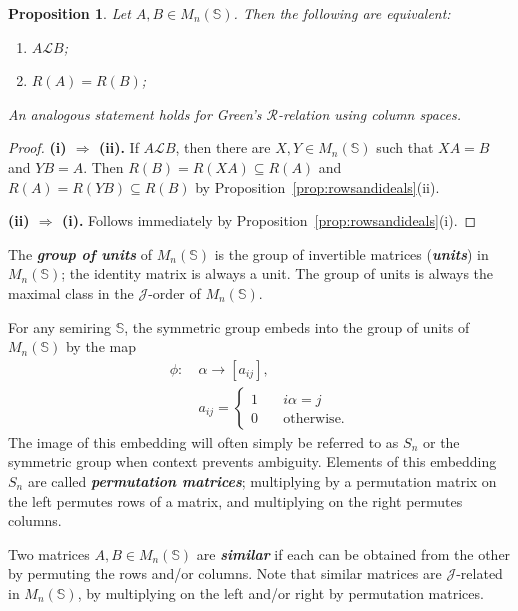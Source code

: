 \documentclass[11pt]{article}
\newtheorem{prop}[thm]{Proposition}
\newcommand{\defn}[1]{\textbf{\textit{#1}}}
\numberwithin{equation}{section}
\renewcommand{\to}{\longrightarrow}
\renewcommand{\L}{\mathscr{L}}
\newcommand{\R}{\mathscr{R}}
\newcommand{\J}{\mathscr{J}}
\begin{document}
\begin{prop} 
  Let $A, B \in M_n(\mathbb{S})$. Then the following are equivalent:
  \begin{enumerate}[label=\roman*]
    \item 
      $A \L B$;

    \item 
      $R(A) = R(B)$;
  \end{enumerate}
  An analogous statement holds for Green's $\R$-relation using column spaces. 
\end{prop}
\begin{proof}
  \textbf{(i) $\Rightarrow$ (ii).} 
  If $A \L B$, then there are $X, Y \in M_n(\mathbb{S})$ such that $XA = B$ and
  $YB = A$. Then $R(B) = R(XA) \subseteq R(A)$ and $R(A) = R(YB) \subseteq R(B)$
  by Proposition~\ref{prop:rowsandideals}(ii).
  \bigskip

  \textbf{(ii) $\Rightarrow$ (i).} Follows immediately by
  Proposition~\ref{prop:rowsandideals}(i). 
\end{proof}

The \defn{group of units} of $M_n(\mathbb{S})$ is the group of invertible
matrices (\defn{units}) in $M_n(\mathbb{S})$; the identity matrix is always a
unit. The group of units is always the maximal class in the $\J$-order of
$M_n(\mathbb{S})$.

For any semiring $\mathbb{S}$, the symmetric group embeds into the group of units of
$M_n(\mathbb{S})$ by the map 
\begin{align*}
  \phi:\: &\alpha \to [a_{ij}], \\
  &a_{ij} =
    \begin{cases}
      1 \quad & i\alpha = j \\ 
      0 \quad &\text{otherwise}.
    \end{cases}
\end{align*}
The image of this embedding will often simply be referred to as $S_n$ or the
symmetric group when context prevents ambiguity. Elements of this embedding
$S_n$ are called \defn{permutation matrices}; multiplying by a permutation
matrix on the left permutes rows of a matrix, and multiplying on the right
permutes columns.

Two matrices $A, B\in M_n(\mathbb{S})$ are \defn{similar} if each can be
obtained from the other by permuting the rows and/or columns. Note that similar
matrices are $\J$-related in $M_n(\mathbb{S})$, by multiplying on the left
and/or right by permutation matrices.
\end{document}
